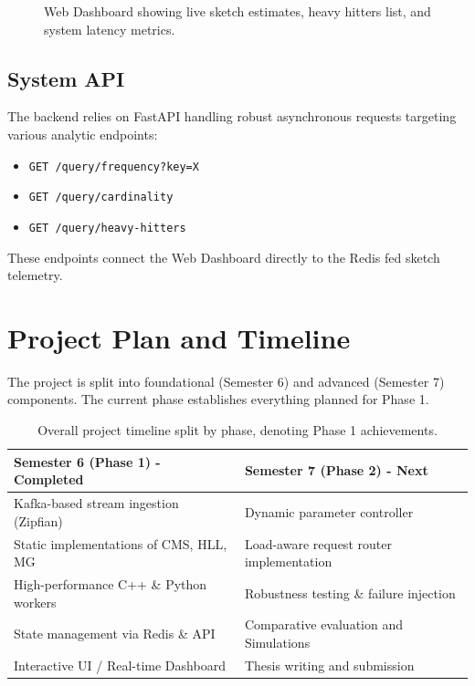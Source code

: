 \documentclass[12pt,a4paper]{article}
\begin{document}
\begin{figure}[H]
    \centering
    \caption{Web Dashboard showing live sketch estimates, heavy hitters list, and system latency metrics.}
    \label{fig:dashboard}
\end{figure}

\subsection{System API}
The backend relies on FastAPI handling robust asynchronous requests targeting various analytic endpoints:
\begin{itemize}
    \item \texttt{GET /query/frequency?key=X} \\
    \item \texttt{GET /query/cardinality} \\
    \item \texttt{GET /query/heavy-hitters}
\end{itemize}
These endpoints connect the Web Dashboard directly to the Redis fed sketch telemetry.

\section{Project Plan and Timeline}
\label{sec:plan}

The project is split into foundational (Semester 6) and advanced (Semester 7) components. The current phase establishes everything planned for Phase 1.

\begin{table}[H]
\centering
\renewcommand{\arraystretch}{1.2}
\begin{tabular}{p{} p{}}
\toprule
\textbf{Semester 6 (Phase 1) - Completed} & \textbf{Semester 7 (Phase 2) - Next} \\
\midrule
Kafka-based stream ingestion (Zipfian) & Dynamic parameter controller \\
Static implementations of CMS, HLL, MG & Load-aware request router implementation \\
High-performance C++ \& Python workers & Robustness testing \& failure injection \\
State management via Redis \& API & Comparative evaluation and Simulations \\
Interactive UI / Real-time Dashboard & Thesis writing and submission \\
\bottomrule
\end{tabular}
\caption{Overall project timeline split by phase, denoting Phase 1 achievements.}
\end{table}
\end{document}
